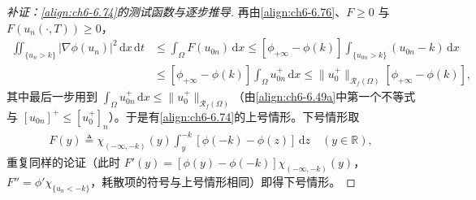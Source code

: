 \documentclass[../../main.tex]{subfiles}%
\begin{document}
\begin{proof}[补证：\eqref{align:ch6-6.74}的测试函数与逐步推导]
再由\eqref{align:ch6-6.76}、$F\geqslant0$ 与 $F(u_n(\cdot,T))\geqslant0$，
\begin{align*}
\iint_{\{u_n>k\}}|\nabla\phi(u_n)|^2\,\mathrm{d}x\,\mathrm{d}t
&\leqslant\int_\Omega F(u_{0n})\,\mathrm{d}x
\leqslant[\phi_{+\infty}-\phi(k)]\int_{\{u_{0n}>k\}}(u_{0n}-k)\,\mathrm{d}x\\
&\leqslant[\phi_{+\infty}-\phi(k)]\int_\Omega u^+_{0n}\,\mathrm{d}x
\leqslant\|u^+_0\|_{\mathscr{R}_f(\Omega)}[\phi_{+\infty}-\phi(k)],
\end{align*}
其中最后一步用到 $\int_\Omega u^+_{0n}\,\mathrm{d}x\leqslant\|u^+_0\|_{\mathscr{R}_f(\Omega)}$（由\eqref{align:ch6-6.49a}中第一个不等式与 $[u_{0n}]^+\leqslant[u^+_0]_n$）。于是有\eqref{align:ch6-6.74}的上号情形。下号情形取
\begin{align*}
F(y)\triangleq\chi_{(-\infty,-k)}(y)\int_y^{-k}[\phi(-k)-\phi(z)]\,\mathrm{d}z\quad(y\in\mathbb{R}),
\end{align*}
重复同样的论证（此时 $F'(y)=[\phi(y)-\phi(-k)]\chi_{(-\infty,-k)}(y)$，$F''=\phi'\chi_{\{u_n<-k\}}$，耗散项的符号与上号情形相同）即得下号情形。
\end{proof}
\end{document}
